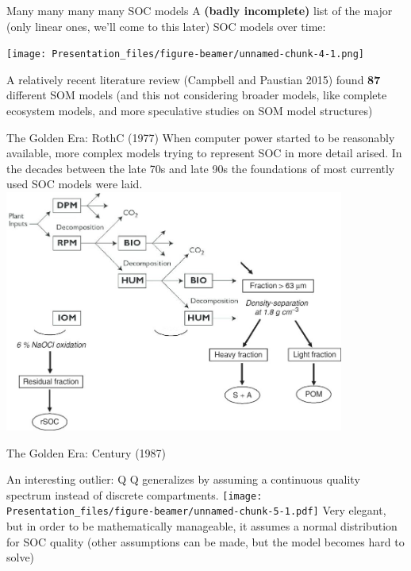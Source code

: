 \documentclass[
  ignorenonframetext,
]{beamer}
\begin{document}
\begin{frame}{Many many many many SOC models}
\protect\hypertarget{many-many-many-many-soc-models}{}
A \textbf{(badly incomplete)} list of the major (only linear ones, we'll
come to this later) SOC models over time:

\texttt{[image: Presentation\_files/figure-beamer/unnamed-chunk-4-1.png]}

A relatively recent literature review (Campbell and Paustian 2015) found
\textbf{87} different SOM models (and this not considering broader
models, like complete ecosystem models, and more speculative studies on
SOM model structures)
\end{frame}

\begin{frame}{The Golden Era: RothC (1977)}
\protect\hypertarget{the-golden-era-rothc-1977}{}
When computer power started to be reasonably available, more complex
models trying to represent SOC in more detail arised. In the decades
between the late 70s and late 90s the foundations of most currently used
SOC models were laid.
\includegraphics[width=\textwidth,height=3.125in]{rothc.jpg}
\end{frame}

\begin{frame}{The Golden Era: Century (1987)}
\protect\hypertarget{the-golden-era-century-1987}{}
\end{frame}

\begin{frame}{An interesting outlier: Q}
\protect\hypertarget{an-interesting-outlier-q}{}
Q generalizes by assuming a continuous quality spectrum instead of
discrete compartments.
\texttt{[image: Presentation\_files/figure-beamer/unnamed-chunk-5-1.pdf]}
Very elegant, but in order to be mathematically manageable, it assumes a
normal distribution for SOC quality (other assumptions can be made, but
the model becomes hard to solve)
\end{frame}
\end{document}

